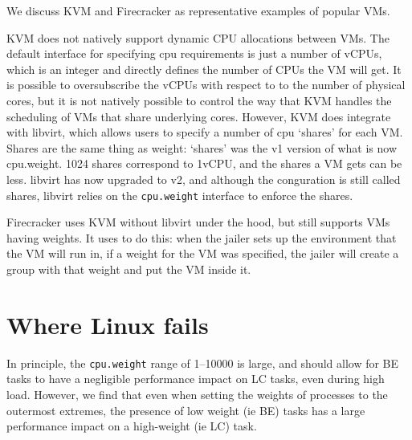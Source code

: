 We discuss KVM and Firecracker as representative examples of popular VMs.

KVM does not natively support dynamic CPU allocations between VMs. The default
interface for specifying cpu requirements is just a number of vCPUs, which is an
integer and directly defines the number of CPUs the VM will get. It is possible
to oversubscribe the vCPUs with respect to to the number of physical cores, but
it is not natively possible to control the way that KVM handles the scheduling
of VMs that share underlying cores. However, KVM does integrate with libvirt,
which allows users to specify a number of cpu `shares' for each VM. Shares are
the same thing as weight: `shares' was the \cgroups{} v1 version of what is now
cpu.weight. 1024 shares correspond to 1vCPU, and the shares a VM gets can be
less. libvirt has now upgraded to \cgroups{} v2, and although the conguration is
still called shares, libvirt relies on the \texttt{cpu.weight} interface to
enforce the shares.

Firecracker uses KVM without libvirt under the hood, but still supports VMs
having weights. It uses \cgroups{} to do this: when the jailer sets up the
environment that the VM will run in, if a weight for the VM was specified, the
jailer will create a group with that weight and put the VM inside it.


\section{Where Linux fails}

In principle, the \texttt{cpu.weight} range of 1--10000 is large, and should
allow for BE tasks to have a negligible performance impact on LC tasks, even
during high load. However, we find that even when setting the weights of
processes to the outermost extremes, the presence of low weight (ie BE) tasks
has a large performance impact on a high-weight (ie LC) task.


